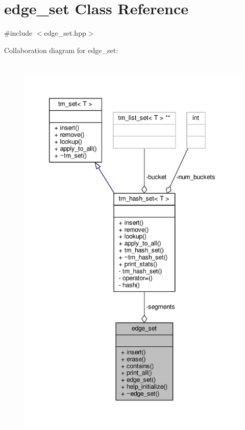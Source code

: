 \hypertarget{classedge__set}{\section{edge\-\_\-set Class Reference}
\label{classedge__set}
}


{\ttfamily \#include $<$edge\-\_\-set.\-hpp$>$}



Collaboration diagram for edge\-\_\-set\-:
\nopagebreak
\begin{figure}[H]
\begin{center}
\leavevmode
\includegraphics[height=550pt]{classedge__set__coll__graph}
\end{center}
\end{figure}
